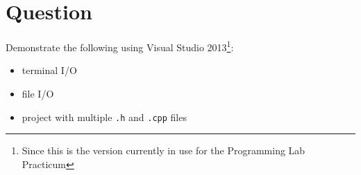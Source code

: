 




\docCopyright

\section{Question}

Demonstrate the following using Visual Studio 2013\footnote{Since this is the
version currently in use for the Programming Lab Practicum}:
\begin{itemize}
  \item terminal I/O
  \item file I/O
  \item project with multiple \texttt{.h} and \texttt{.cpp}
    files
\end{itemize}



